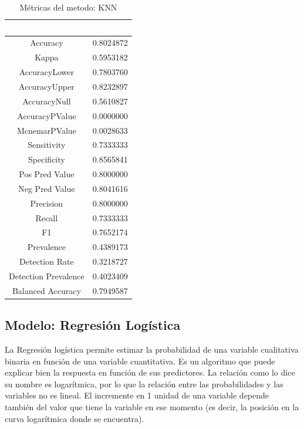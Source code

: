 \begin{table}[!h]
	
	\caption{\label{tab:metricas_KNN}Métricas del metodo: KNN }
	\centering
	\begin{tabular}[t]{cc}
		\toprule
		\rowcolor{black}  \multicolumn{1}{c}{\textcolor{white}{\textbf{metricas}}} & \multicolumn{1}{c}{\textcolor{white}{\textbf{valor}}}\\
		\midrule
		\rowcolor{gray!6}  Accuracy & 0.8024872\\
		Kappa & 0.5953182\\
		\rowcolor{gray!6}  AccuracyLower & 0.7803760\\
		AccuracyUpper & 0.8232897\\
		\rowcolor{gray!6}  AccuracyNull & 0.5610827\\
		\addlinespace
		AccuracyPValue & 0.0000000\\
		\rowcolor{gray!6}  McnemarPValue & 0.0028633\\
		Sensitivity & 0.7333333\\
		\rowcolor{gray!6}  Specificity & 0.8565841\\
		Pos Pred Value & 0.8000000\\
		\addlinespace
		\rowcolor{gray!6}  Neg Pred Value & 0.8041616\\
		Precision & 0.8000000\\
		\rowcolor{gray!6}  Recall & 0.7333333\\
		F1 & 0.7652174\\
		\rowcolor{gray!6}  Prevalence & 0.4389173\\
		\addlinespace
		Detection Rate & 0.3218727\\
		\rowcolor{gray!6}  Detection Prevalence & 0.4023409\\
		Balanced Accuracy & 0.7949587\\
		\bottomrule
	\end{tabular}
\end{table}



\subsection{Modelo: Regresión Logística}

La Regresión logística permite estimar la probabilidad de una variable cualitativa binaria en
función de una variable cuantitativa. Es un algoritmo que puede explicar
bien la respuesta en función de sus predictores. La relación como lo
dice su nombre es logarítmica, por lo que la relación entre las
probabilidades y las variables no es lineal. El incremente en 1 unidad de
una variable depende también del valor que tiene la variable en ese
momento (es decir, la posición en la curva logarítmica donde se
encuentra).

